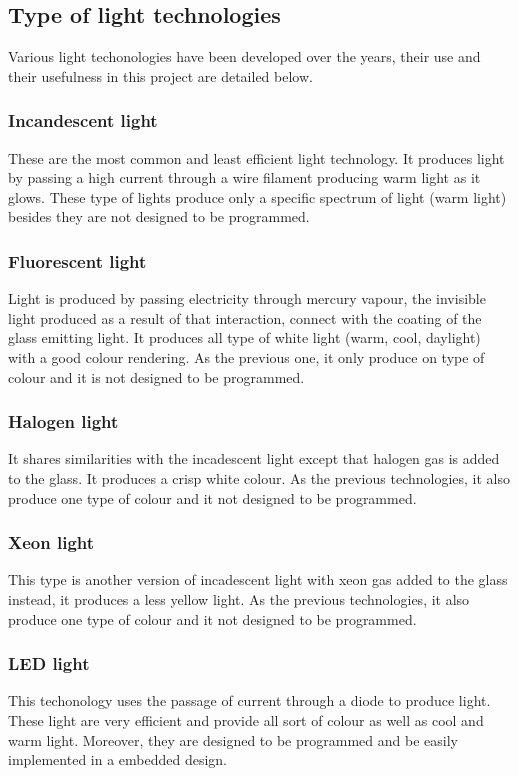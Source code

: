 \subsection{Type of light technologies}
Various light techonologies have been developed over the years, their use and their usefulness in this project are detailed below. 
\subsubsection{Incandescent light}
These are the most common and least efficient light technology. It produces light by passing a high current through a wire filament producing warm light as it glows. These type of lights produce only a specific spectrum of light (warm light) besides they are not designed to be programmed. 
\subsubsection{Fluorescent light}
Light is produced by passing electricity through mercury vapour, the invisible light produced as a result of that interaction, connect with the coating of the glass emitting light. It produces all type of white light (warm, cool, daylight) with a good colour rendering. As the previous one, it only produce on type of colour and it is not designed to be programmed.
\subsubsection{Halogen light}
It shares similarities with the incadescent light except that halogen gas is added to the glass. It produces a crisp white colour. As the previous technologies, it also produce one type of colour and it not designed to  be programmed.
\subsubsection{Xeon light}
This type is another version of incadescent light with xeon gas added to the glass instead, it produces a less yellow light. As the previous technologies, it also produce one type of colour and it not designed to  be programmed.
\subsubsection{LED light}
This techonology uses the passage of current through a diode to produce light. These light are very efficient and provide all sort of colour as well as cool and warm light. Moreover, they are designed to be programmed and be easily implemented in a embedded design. 
